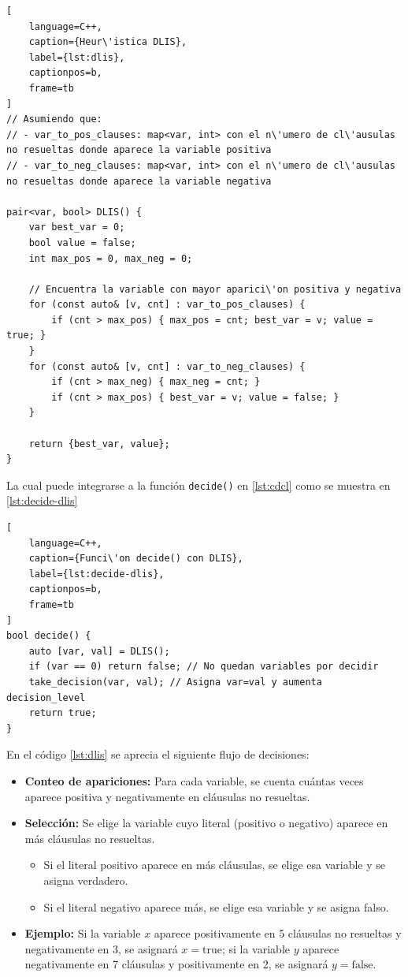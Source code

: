 \begin{lstlisting}[
    language=C++,
    caption={Heur\'istica DLIS},
    label={lst:dlis},
    captionpos=b,
    frame=tb
]
// Asumiendo que:
// - var_to_pos_clauses: map<var, int> con el n\'umero de cl\'ausulas no resueltas donde aparece la variable positiva
// - var_to_neg_clauses: map<var, int> con el n\'umero de cl\'ausulas no resueltas donde aparece la variable negativa

pair<var, bool> DLIS() {
    var best_var = 0;
    bool value = false;
    int max_pos = 0, max_neg = 0;

    // Encuentra la variable con mayor aparici\'on positiva y negativa
    for (const auto& [v, cnt] : var_to_pos_clauses) {
        if (cnt > max_pos) { max_pos = cnt; best_var = v; value = true; }
    }
    for (const auto& [v, cnt] : var_to_neg_clauses) {
        if (cnt > max_neg) { max_neg = cnt; }
        if (cnt > max_pos) { best_var = v; value = false; }
    }

    return {best_var, value};
}
\end{lstlisting}

La cual puede integrarse a la funci\'on \texttt{decide()} en \ref{lst:cdcl} como se muestra en \ref{lst:decide-dlis}

\begin{lstlisting}[
    language=C++,
    caption={Funci\'on decide() con DLIS},
    label={lst:decide-dlis},
    captionpos=b,
    frame=tb
]
bool decide() {
    auto [var, val] = DLIS();
    if (var == 0) return false; // No quedan variables por decidir
    take_decision(var, val); // Asigna var=val y aumenta decision_level
    return true;
}
\end{lstlisting}

En el c\'odigo \ref{lst:dlis} se aprecia el siguiente flujo de decisiones:

\begin{itemize}
    \item \textbf{Conteo de apariciones:} Para cada variable, se cuenta cuántas veces aparece positiva y negativamente en cláusulas no resueltas.
    \item \textbf{Selección:} Se elige la variable cuyo literal (positivo o negativo) aparece en más cláusulas no resueltas.
    \begin{itemize}
        \item Si el literal positivo aparece en más cláusulas, se elige esa variable y se asigna verdadero.
        \item Si el literal negativo aparece más, se elige esa variable y se asigna falso.
    \end{itemize}
    \item \textbf{Ejemplo:} Si la variable $x$ aparece positivamente en 5 cláusulas no resueltas y negativamente en 3, se asignará $x = \mathrm{true}$; si la variable $y$ aparece negativamente en 7 cláusulas y positivamente en 2, se asignará $y = \mathrm{false}$.
\end{itemize}

